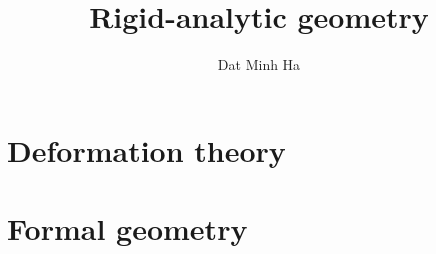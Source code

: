 

\setcounter{chapter}{-1}




	\title{Rigid-analytic geometry}
	
	\author{Dat Minh Ha}
	\maketitle
	
	\begin{abstract}
	    
	\end{abstract}
	
	{
      \hypersetup{} 
      \tableofcontents %
    }
    
    
    
    \chapter{Deformation theory}
        \begin{abstract}
            
        \end{abstract}
        
        \minitoc
    
        
        
        
        
        
    
    \chapter{Formal geometry}
        \begin{abstract}
            
        \end{abstract}
        
        \minitoc
        
        
        
        
        
        
    
